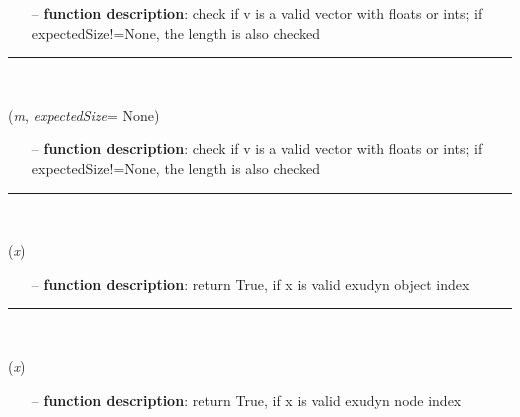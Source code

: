 \begin{itemize}[leftmargin=1.4cm]
\begin{itemize}[leftmargin=0.7cm]
\item[--]
{\bf function description}: check if v is a valid vector with floats or ints; if expectedSize!=None, the length is also checked
\vspace{12pt}\end{itemize}
%
\noindent\rule{8cm}{0.75pt}\vspace{1pt} \\ 
\begin{flushleft}
\label{sec:advancedUtilities:IsSquareMatrix}
({\it m}, {\it expectedSize}= None)
\end{flushleft}
\setlength{\itemindent}{0.7cm}
\begin{itemize}[leftmargin=0.7cm]
\item[--]
{\bf function description}: check if v is a valid vector with floats or ints; if expectedSize!=None, the length is also checked
\vspace{12pt}\end{itemize}
%
\noindent\rule{8cm}{0.75pt}\vspace{1pt} \\ 
\begin{flushleft}
\label{sec:advancedUtilities:IsValidObjectIndex}
({\it x})
\end{flushleft}
\setlength{\itemindent}{0.7cm}
\begin{itemize}[leftmargin=0.7cm]
\item[--]
{\bf function description}: return True, if x is valid exudyn object index
\vspace{12pt}\end{itemize}
%
\noindent\rule{8cm}{0.75pt}\vspace{1pt} \\ 
\begin{flushleft}
\label{sec:advancedUtilities:IsValidNodeIndex}
({\it x})
\end{flushleft}
\setlength{\itemindent}{0.7cm}
\begin{itemize}[leftmargin=0.7cm]
\item[--]
{\bf function description}: return True, if x is valid exudyn node index

\end{itemize}
\end{itemize}
